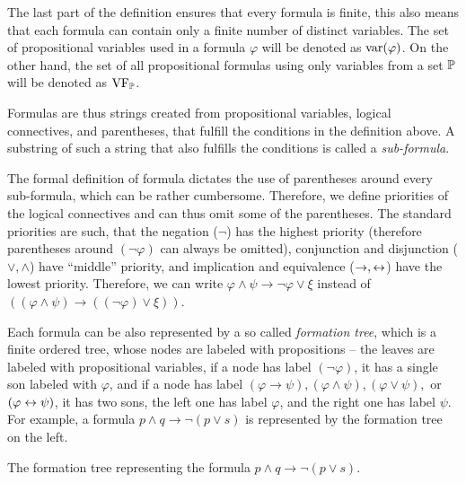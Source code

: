 The last part of the definition ensures that every formula is finite, this also means that each formula can contain only a finite number of distinct variables. The set of propositional variables used in a formula $\varphi$ will be denoted as $\operatorname{var}(\varphi)$. On the other hand, the set of all propositional formulas using only variables from a set $\mathbb{P}$ will be denoted as $\operatorname{VF}_\mathbb{P}$.

Formulas are thus strings created from propositional variables, logical connectives, and parentheses, that fulfill the conditions in the definition above. A substring of such a string that also fulfills the conditions is called a \emph{sub-formula}. 

The formal definition of formula dictates the use of parentheses around every sub-formula, which can be rather cumbersome. Therefore, we define priorities of the logical connectives and can thus omit some of the parentheses. The standard priorities are such, that the negation ($\neg$) has the highest priority (therefore parentheses around $(\neg \varphi)$ can always be omitted), conjunction and disjunction ($\lor, \land$) have ``middle'' priority, and implication and equivalence ($\to, \leftrightarrow$) have the lowest priority. Therefore, we can write $\varphi \land \psi \to \neg \varphi \lor \xi$ instead of $((\varphi \land \psi) \to ((\neg \varphi) \lor \xi))$. 

Each formula can be also represented by a so called \emph{formation tree}, which is a finite ordered tree, whose nodes are labeled with propositions -- the leaves are labeled with propositional variables, if a node has label $(\neg \varphi)$, it has a single son labeled with $\varphi$, and if a node has label $(\varphi \to \psi), (\varphi \land \psi), (\varphi \lor \psi),$ or $(\varphi \leftrightarrow \psi)$, it has two sons, the left one has label $\varphi$, and the right one has label $\psi$. For example, a formula $p \land q \to \neg (p \lor s)$ is represented by the formation tree on the left.
\begin{marginfigure}[-4\baselineskip]
\centering
{}
\caption{The formation tree representing the formula $p \land q \to \neg (p \lor s)$.}
\end{marginfigure}

